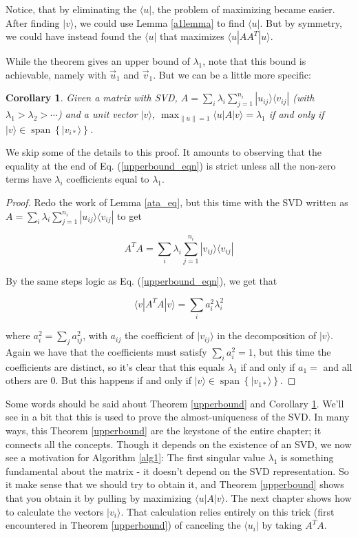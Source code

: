 \documentclass{amsbook}
\newtheorem{corollary}[theorem]{Corollary}
\begin{document}
Notice, that by eliminating the $\langle u|$, the problem of maximizing became easier.  After finding $|v\rangle$, we could use Lemma \ref{a1lemma} to find $\langle u|$.  But by symmetry, we could have instead found the $\langle u|$ that maximizes $\langle u|AA^T|u\rangle$.

While the theorem gives an upper bound of $\lambda_1$, note that this bound is achievable, namely with $\vec u_1$ and $\vec v_1$.  But we can be a little more specific:

\begin{corollary}
\label{corollary1}
Given a matrix with SVD, $A=\sum_i\lambda_i\sum_{j=1}^{n_i}|u_{ij}\rangle\langle v_{ij}|$ (with $\lambda_1>\lambda_2>\cdots$) and a unit vector $|v\rangle$, $\max_{\|u\|=1}\langle u|A|v\rangle=\lambda_1$ if and only if $|v\rangle\in\operatorname{span}\left\{|v_{i*}\rangle\right\}$.
\end{corollary}

We skip some of the details to this proof.  It amounts to observing that the equality at the end of Eq. (\ref{upperbound_eqn}) is strict unless all the non-zero terms have $\lambda_i$ coefficients equal to $\lambda_1$.

\begin{proof}
Redo the work of Lemma \ref{ata_eq}, but this time with the SVD written as $A=\sum_i\lambda_i\sum_{j=1}^{n_i}|u_{ij}\rangle\langle v_{ij}|$ to get

$$
A^TA=\sum_i\lambda_i\sum_{j=1}^{n_i}|v_{ij}\rangle\langle v_{ij}|
$$

By the same steps logic as Eq. (\ref{upperbound_eqn}), we get that

$$
\langle v|A^TA|v\rangle = \sum_ia_i^2\lambda_i^2
$$

where $a_i^2=\sum_ja_{ij}^2$, with $a_{ij}$ the coefficient of $|v_{ij}\rangle$ in the decomposition of $|v\rangle$.  Again we have that the coefficients must satisfy $\sum_ia_i^2=1$, but this time the coefficients are distinct, so it's clear that this equals $\lambda_1$ if and only if $a_1=$ and all others are $0$.  But this happens if and only if $|v\rangle\in\operatorname{span}\left\{|v_{1*}\rangle\right\}$.

\end{proof}

Some words should be said about Theorem \ref{upperbound} and Corollary \ref{corollary1}.  We'll see in a bit that this is used to prove the almost-uniqueness of the SVD.  In many ways, this Theorem \ref{upperbound} are the keystone of the entire chapter; it connects all the concepts.  Though it depends on the existence of an SVD, we now see a motivation for Algorithm \ref{alg1}:  The first singular value $\lambda_1$ is something fundamental about the matrix - it doesn't depend on the SVD representation.  So it make sense that we should try to obtain it, and Theorem \ref{upperbound} shows that you obtain it by pulling by maximizing $\langle u|A|v\rangle$.  The next chapter shows how to calculate the vectors $|v_i\rangle$.  That calculation relies entirely on this trick (first encountered in Theorem \ref{upperbound}) of canceling the $\langle u_i|$ by taking $A^TA$.
\end{document}
